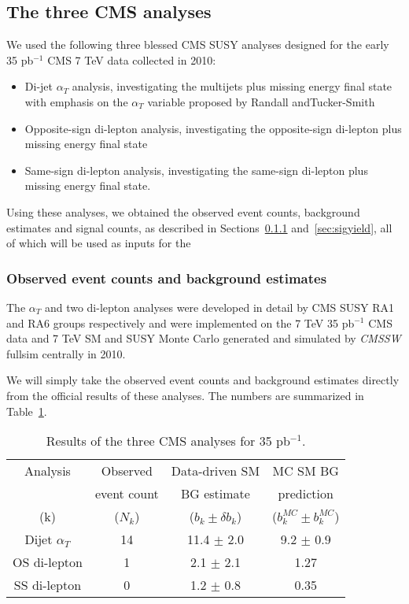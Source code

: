 \subsection{The three CMS analyses}

We used the following three blessed CMS SUSY analyses designed for the early 35 pb$^{-1}$ CMS 7 TeV data  collected in 2010:
\begin{itemize}
\item Di-jet $\alpha_T$ analysis, investigating the multijets plus missing energy final state with emphasis on the $\alpha_T$ variable proposed by Randall andTucker-Smith
\item Opposite-sign di-lepton analysis, investigating the opposite-sign di-lepton plus missing energy final state
\item Same-sign di-lepton analysis, investigating the same-sign di-lepton plus missing energy final state.
\end{itemize}

Using these analyses, we obtained the observed event counts, background estimates and signal counts, as described in Sections~\ref{sec:dbgcount} and~\ref{sec:sigyield}, all of which will be used as inputs for the 

\subsubsection{Observed event counts and background estimates}
\label{sec:dbgcount}

The $\alpha_T$ and two di-lepton analyses were developed in detail by CMS SUSY RA1 and RA6 groups respectively and were implemented on the 7 TeV 35 pb$^{-1}$ CMS data and 7 TeV SM and SUSY Monte Carlo generated and simulated by {\it CMSSW} fullsim centrally in 2010.

We will simply take the observed event counts and background estimates directly from the official results of these analyses.  The numbers are summarized in Table~\ref{tab:dbgcount}.

\begin{table}[htdp]
\caption{Results of the three CMS analyses for 35 pb$^{-1}$.}
\begin{center}
\begin{tabular}{|c|c|c|c|}
\hline
Analysis & Observed    & Data-driven SM & MC SM BG \\
              & event count & BG estimate      & prediction    \\
(k)          & ($N_k$)     & ($b_k \pm \delta b_k$) & ($b_k^{MC} \pm b_k^{MC}$) \\
\hline              
Dijet $\alpha_T$ & 14 & 11.4 $\pm$ 2.0 & 9.2 $\pm$ 0.9 \\
OS di-lepton & 1 & 2.1 $\pm$ 2.1 & 1.27 \\
SS di-lepton & 0 & 1.2 $\pm$ 0.8 & 0.35 \\
\hline
\end{tabular}
\end{center}
\label{tab:dbgcount}
\end{table}%


